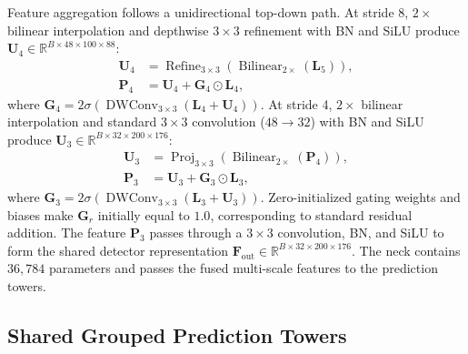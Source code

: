 Feature aggregation follows a unidirectional top-down path. At stride 8, $2\times$ bilinear interpolation and depthwise $3 \times 3$ refinement with BN and SiLU produce $\mathbf{U}_4 \in \mathbb{R}^{B \times 48 \times 100 \times 88}$:
\begin{align}
    \mathbf{U}_4 &= \operatorname{Refine}_{3\times 3}\left(\operatorname{Bilinear}_{2\times}(\mathbf{L}_5)\right),\nonumber\\
    \mathbf{P}_4 &= \mathbf{U}_4 + \mathbf{G}_4 \odot \mathbf{L}_4,
    \label{eq:scale_gating_u4}
\end{align}
where $\mathbf{G}_4 = 2\sigma(\operatorname{DWConv}_{3\times3}(\mathbf{L}_4 + \mathbf{U}_4))$. At stride 4, $2\times$ bilinear interpolation and standard $3 \times 3$ convolution ($48 \rightarrow 32$) with BN and SiLU produce $\mathbf{U}_3 \in \mathbb{R}^{B \times 32 \times 200 \times 176}$:
\begin{align}
    \mathbf{U}_3 &= \operatorname{Proj}_{3\times 3}\left(\operatorname{Bilinear}_{2\times}(\mathbf{P}_4)\right),\nonumber\\
    \mathbf{P}_3 &= \mathbf{U}_3 + \mathbf{G}_3 \odot \mathbf{L}_3,
    \label{eq:scale_gating_u3}
\end{align}
where $\mathbf{G}_3 = 2\sigma(\operatorname{DWConv}_{3\times3}(\mathbf{L}_3 + \mathbf{U}_3))$. Zero-initialized gating weights and biases make $\mathbf{G}_r$ initially equal to $1.0$, corresponding to standard residual addition. The feature $\mathbf{P}_3$ passes through a $3 \times 3$ convolution, BN, and SiLU to form the shared detector representation $\mathbf{F}_{\mathrm{out}} \in \mathbb{R}^{B \times 32 \times 200 \times 176}$. The neck contains $36,784$ parameters and passes the fused multi-scale features to the prediction towers.

\subsection{Shared Grouped Prediction Towers}
\label{sec:grouped_heads}

